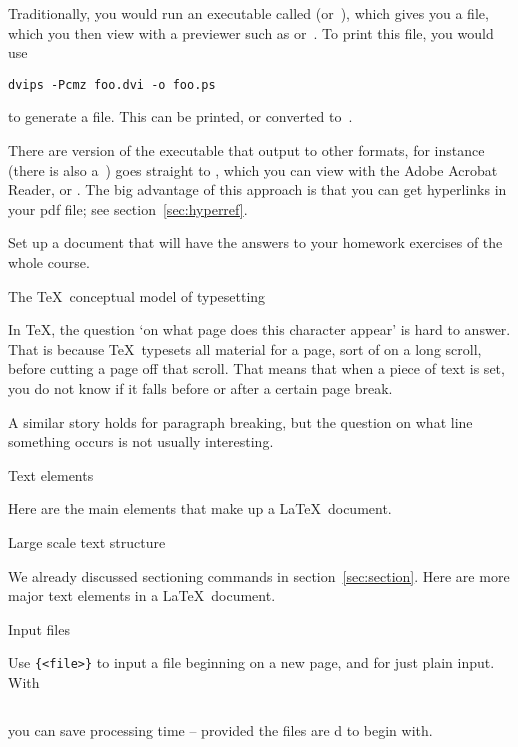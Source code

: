 Traditionally, you would run an executable called 
(or~), which gives you a  file, which you then view with
a previewer such as  or~. To print this file, you
would use
\begin{verbatim}
dvips -Pcmz foo.dvi -o foo.ps
\end{verbatim}
to generate a  file. This can be
printed, or converted to~.

There are version of the  executable that output to other
formats, for instance  (there is also a~) goes
straight to , which you can view with the Adobe Acrobat Reader,
or . The big advantage of this approach is that you can get
hyperlinks in your pdf file; see section~\ref{sec:hyperref}.

\begin{594exercise}
Set up a document that will have the answers to your homework
exercises of the whole course.
\end{594exercise}

 {The \TeX\ conceptual model of typesetting}

In \TeX, the question `on what page does this character
appear' is hard to answer. That is because \TeX\ typesets all material
for a page, sort of on a long scroll, before cutting a page off that
scroll. That means that when a piece of text is set, you do not know
if it falls before or after a certain page break.

A similar story holds for paragraph breaking, but the question on what
line something occurs is not usually interesting.

 {Text elements}

Here are the main elements that make up a \LaTeX\ document.

 {Large scale text structure}

We already discussed sectioning commands in
section~\ref{sec:section}. Here are more major text elements in a
\LaTeX\ document.

 {Input files}

Use \verb+{<file>}+ to input a file beginning on a
new page, and  for just plain input. With
\begin{verbatim}

\end{verbatim}
you can save processing time -- provided the files are d
to begin with.

